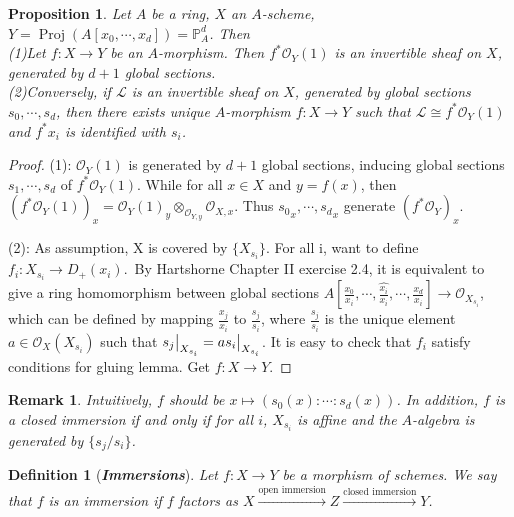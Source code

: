 \documentclass{ctexart}
\newtheorem{definition}{Definition}[section]
\newtheorem{remark}{Remark}[section]
\newtheorem{proposition}{Proposition}[section]
\newcommand{\proj}{\operatorname{Proj}}
\begin{document}
\begin{proposition}
    Let $A$ be a ring, $X$ an $A$-scheme, $Y = \proj (A[x_{0}, \cdots, x_{d}]) = \mathbb{P}_{A}^{d}$.
    Then \\
    (1)Let $f: X \longrightarrow Y$ be an $A$-morphism.
    Then $f^{\ast}\mathcal{O}_{Y}(1)$ is an invertible sheaf on $X$, generated by $d + 1$ global sections. \\
    (2)Conversely, if $\mathcal{L}$ is an invertible sheaf on $X$, generated by global sections $s_{0}, \cdots, s_{d}$,
    then there exists unique $A$-morphism $f: X \longrightarrow Y$ such that $\mathcal{L} \cong f^{\ast}\mathcal{O}_{Y}(1)$ and $f^{\ast}x_{i}$ is identified with $s_{i}$.
    \label{Proposition 6.10}
\end{proposition}
\begin{proof}
    (1): $\mathcal{O}_{Y}(1)$ is generated by $d + 1$ global sections, inducing global sections $s_{1}, \cdots, s_{d}$ of $f^{\ast}\mathcal{O}_{Y}(1)$.
    While for all $x\in X$ and $y = f(x)$, then $(f^{\ast}\mathcal{O}_{Y}(1))_{x} = \mathcal{O}_{Y}(1)_{y} \otimes_{\mathcal{O}_{Y, y}} \mathcal{O}_{X, x}$.
    Thus ${s_{0}}_{x}, \cdots, {s_{d}}_{x}$ generate $(f^{\ast}\mathcal{O}_{Y})_{x}$.
    \par
    (2): As assumption, X is covered by $\{X_{s_{i}}\}$.
    For all i, want to define $f_{i}: X_{s_{i}} \longrightarrow D_{+}(x_{i})$.\
    By Hartshorne Chapter II exercise 2.4, it is equivalent to give a ring homomorphism between global sections $A[\frac{x_{0}}{x_{i}}, \cdots, \widehat{\frac{x_{i}}{x_{i}}}, \cdots, \frac{x_{d}}{x_{i}}] \longrightarrow \mathcal{O}_{X_{s_{i}}}$,
    which can be defined by mapping $\frac{x_{j}}{x_{i}}$ to $\frac{s_{j}}{s_{i}}$,
    where $\frac{s_{j}}{s_{i}}$ is the unique element $a\in \mathcal{O}_{X}(X_{s_{i}})$ such that $s_{j}\big{|}_{X_{s_{i}}} = as_{i}\big{|}_{X_{s_{i}}}$.
    It is easy to check that $f_{i}$ satisfy conditions for gluing lemma.
    Get $f: X \longrightarrow Y$.
\end{proof}
\begin{remark}
    Intuitively, $f$ should be $x \longmapsto (s_{0}(x) : \cdots : s_{d}(x))$.
    In addition, $f$ is a closed immersion if and only if for all $i$, $X_{s_{i}}$ is affine and the $A$-algebra is generated by $\{s_{j}/s_{i}\}$.
\end{remark}
\begin{definition}[\textbf{\emph{Immersions}}]
    Let $f: X \longrightarrow Y$ be a morphism of schemes.
    We say that $f$ is an immersion if $f$ factors as $X \overset{\text{open immersion}}{\longrightarrow} Z \overset{\text{closed immersion}}{\longrightarrow} Y$.
\end{definition}
\end{document}
